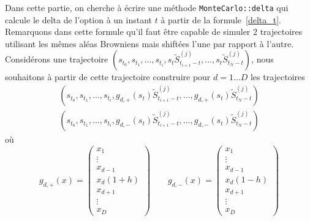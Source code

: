 \documentclass[a4paper,11pt]{article}
\def\var#1{{\tt #1}}
\begin{document}
Dans cette partie, on cherche à écrire une méthode \var{MonteCarlo::delta} qui
calcule le delta de l'option à un instant $t$ à partir de la
formule~\eqref{delta_t}.  Remarquons dans cette formule qu'il faut être capable
de simuler $2$ trajectoires utilisant les mêmes aléas Browniens mais shiftées
l'une par rapport à l'autre. Considérons une trajectoire $(s_{t_0}, s_{t_1},
\dots, s_{t_i}, s_t \tilde S_{t_{i+1} - t}^{(j)}, \dots,  s_t \tilde S_{t_N -
t}^{(j)})$, nous souhaitons à partir de cette trajectoire construire pour
$d=1\dots D$ les trajectoires
\begin{align*}
  (s_{t_0}, s_{t_1}, \dots, s_{t_i}, g_{d,+}(s_t) \tilde S_{t_{i+1} - t}^{(j)},
 \dots,  g_{d,+}(s_t) \tilde S_{t_N - t}^{(j)})  \\
 (s_{t_0}, s_{t_1}, \dots, s_{t_i}, g_{d,-}(s_t) \tilde S_{t_{i+1} - t}^{(j)},
 \dots, g_{d,-}(s_t)   \tilde S_{t_N - t}^{(j)})
\end{align*}
où
\begin{equation*}
  g_{d,+}(x)  = \left(\begin{array}{c}
    x_1 \\
    \vdots\\
    x_{d-1} \\
    x_d (1+h) \\
    x_{d+1} \\
    \vdots\\
    x_D
  \end{array}\right) \qquad g_{d,-}(x)  = \left(\begin{array}{c}
    x_1 \\
    \vdots\\
    x_{d-1} \\
    x_d (1-h) \\
    x_{d+1} \\
    \vdots\\
    x_D
  \end{array}\right)
\end{equation*}
\end{document}
